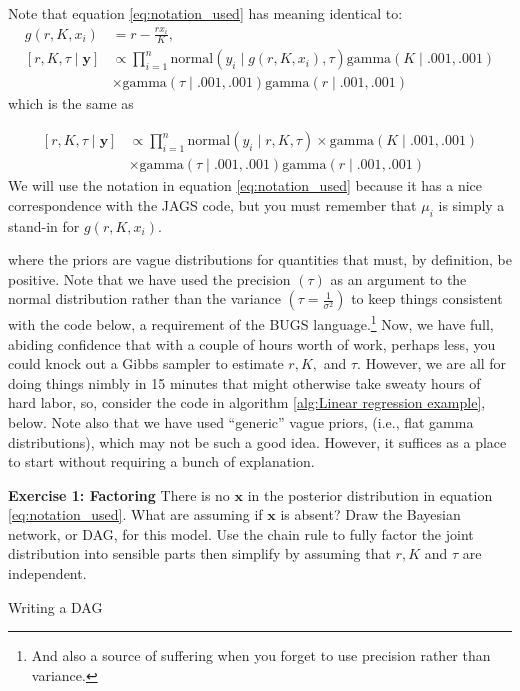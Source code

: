 \documentclass[12pt,english]{article}
\begin{document}
\begin{tcolorbox}

Note that equation \ref{eq:notation_used} has meaning identical to:
\begin{align}
g(r,K,x_i)& =  r-\frac{rx_{i}}{K}\textrm{,}\\
\left[r,K,\tau\mid\mathbf{y}\right]  &\propto  \prod_{i=1}^{n}\textrm{normal}\left(y_{i}\mid g(r,K,x_i),\tau\right) \textrm{gamma}\left(K\mid.001,.001\right) \nonumber \\ 
& \times \textrm{gamma}\left(\tau\mid.001,.001\right)\textrm{gamma}\left(r\mid.001,.001\right)\nonumber
\end{align}
which is the same as 

\begin{align}
\left[r,K,\tau\mid\mathbf{y}\right]  &\propto  \prod_{i=1}^{n}\textrm{normal}\left(y_{i}\mid r,K,\tau\right)\times\label{eq:conditional} \textrm{gamma}\left(K\mid.001,.001\right) \nonumber \\
 &\times \textrm{gamma}\left(\tau\mid.001,.001\right)\textrm{gamma}\left(r\mid.001,.001\right) \nonumber
\end{align}
We will use the notation in equation  \ref{eq:notation_used} because it has a nice correspondence with the JAGS code, but you must remember that $\mu_i$ is simply a stand-in for $g(r,K,x_i)$.


\end{tcolorbox}


\noindent where the priors are vague distributions for quantities that must, by definition, be positive. Note that we have used the precision $(\tau)$ as an argument to the normal distribution rather than the variance $\left(\tau=\frac{1}{\sigma^{2}}\right)$ to keep things consistent with the code below, a requirement of the BUGS language.\footnote{And also a source of suffering when you forget to use precision rather than variance.} Now, we have full, abiding confidence that with a couple of hours worth of work, perhaps less, you could knock out a Gibbs sampler to estimate $r,K,$ and $\tau$. However, we are all for doing things nimbly in 15 minutes that might otherwise take  sweaty hours of hard labor, so, consider the code in algorithm \ref{alg:Linear regression example}, below. Note also that we have used \enquote{generic} vague priors, (i.e., flat gamma distributions), which may not be such a good idea. However, it suffices as a place to start without requiring a bunch of explanation.

\bigskip
\belowcaptionskip=-40pt
\begin{exercise}
\begin{mdframed}
\doublespacing
\textbf{Exercise 1:  Factoring} There is no $\mathbf{x}$ in the posterior distribution in equation \ref{eq:notation_used}. What are assuming if $\mathbf{x}$ is absent? Draw the Bayesian network, or DAG, for this model. Use the chain rule to fully factor the joint distribution into sensible parts then simplify by assuming that $r,K$ and $\tau$ are independent.
\end{mdframed}
\captionsetup{textformat=empty, labelformat=empty}
\caption{Writing a DAG}
\label{ex:DAG}
\end{exercise}
\belowcaptionskip=0pt
\end{document}
